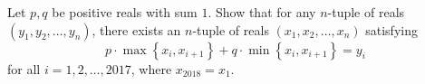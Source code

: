 Let $p,q$ be positive reals with sum $1$. Show that for any $n$-tuple of reals $\left(y_1,y_2,\ldots,y_n\right)$, there exists an $n$-tuple of reals $\left(x_1,x_2,\ldots,x_n\right)$ satisfying \[p\cdot\max\left\{x_i,x_{i+1}\right\}+q\cdot\min\left\{x_i,x_{i+1}\right\}=y_i\] for all $i=1,2,\ldots,2017$, where $x_{2018}=x_1$.